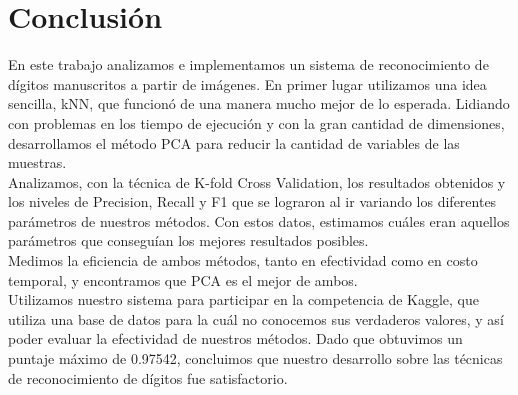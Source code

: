 \section{Conclusión}

En este trabajo analizamos e implementamos un sistema de reconocimiento de dígitos manuscritos a partir de imágenes. En primer lugar utilizamos una idea sencilla, kNN, que funcionó de una manera mucho mejor de lo esperada. Lidiando con problemas en los tiempo de ejecución y con la gran cantidad de dimensiones, desarrollamos el método PCA para reducir la cantidad de variables de las muestras. \\

Analizamos, con la técnica de K-fold Cross Validation, los resultados obtenidos y los niveles de Precision, Recall y F1 que se lograron al ir variando los diferentes parámetros de nuestros métodos. Con estos datos, estimamos cuáles eran aquellos parámetros que conseguían los mejores resultados posibles. \\

Medimos la eficiencia de ambos métodos, tanto en efectividad como en costo temporal, y encontramos que PCA es el mejor de ambos. \\

Utilizamos nuestro sistema para participar en la competencia de Kaggle, que utiliza una base de datos para la cuál no conocemos sus verdaderos valores, y así poder evaluar la efectividad de nuestros métodos. Dado que obtuvimos un puntaje máximo de 0.97542, concluimos que nuestro desarrollo sobre las técnicas de reconocimiento de dígitos fue satisfactorio. \\

